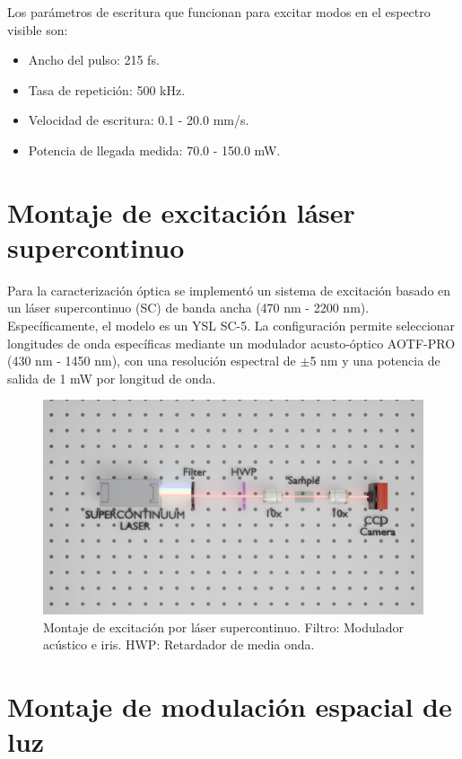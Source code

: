 Los parámetros de escritura que funcionan para excitar modos en el espectro visible son:
\begin{itemize}
	\item Ancho del pulso: 215 fs.
    \item Tasa de repetición: 500 kHz.
    \item Velocidad de escritura: 0.1 - 20.0 mm/s.
    \item Potencia de llegada medida: 70.0 - 150.0 mW.
\end{itemize}

\section{Montaje de excitación láser supercontinuo \label{cap:wavelength}}

Para la caracterización óptica se implementó un sistema de excitación basado en un láser supercontinuo (SC) de banda ancha (470 nm - 2200 nm). Específicamente, el modelo es un YSL SC-5. La configuración permite seleccionar longitudes de onda específicas mediante un modulador acusto-óptico AOTF-PRO (430 nm - 1450 nm), con una resolución espectral de $\pm$5 nm y una potencia de salida de 1 mW por longitud de onda.

\begin{figure}[H]
    \centering
    \includegraphics[width=\linewidth, trim={5cm 9cm 3cm 7cm},clip]{media/SC_setup}
    \caption[Montaje de excitación por láser supercontinuo.]{Montaje de excitación por láser supercontinuo. Filtro: Modulador acústico e iris. HWP: Retardador de media onda.}
\end{figure}

\section{Montaje de modulación espacial de luz}

